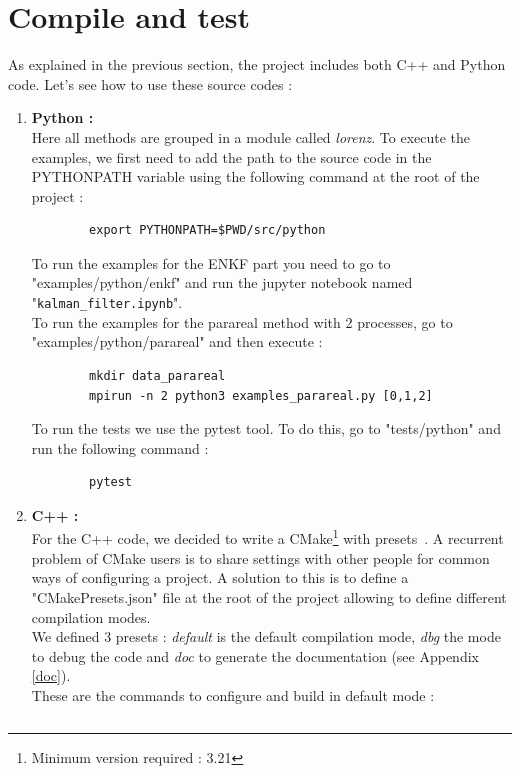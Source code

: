 \newpage

\section{Compile and test}
\label{compile}

	As explained in the previous section, the project includes both C++ and Python code. Let's see how to use these source codes :
	\begin{enumerate}[label=\textbullet]
		\item \textbf{Python :} \\
		Here all methods are grouped in a module called \textit{lorenz}. To execute the examples, we first need to add the path to the source code in the PYTHONPATH variable using the following command at the root of the project :
\begin{lstlisting}
		export PYTHONPATH=$PWD/src/python
\end{lstlisting}
		  To run the examples for the ENKF part you need to go to "examples/python/enkf" and run the jupyter notebook named "\texttt{kalman\_filter.ipynb}". \\
		To run the examples for the parareal method with 2 processes, go to "examples/python/parareal" and then execute :
\begin{lstlisting}
		mkdir data_parareal
		mpirun -n 2 python3 examples_parareal.py [0,1,2]
\end{lstlisting}
		To run the tests we use the pytest tool. To do this, go to "tests/python" and run the following command :
\begin{lstlisting}
		pytest
\end{lstlisting}
		\item \textbf{C++ :} \\
		For the C++ code, we decided to write a CMake\footnote[1]{Minimum version required : 3.21} with presets~\cite{cmake_preset}.  A recurrent problem of CMake users is to share settings with other people for common ways of configuring a project. A solution to this is to define a "CMakePresets.json" file at the root of the project allowing to define different compilation modes. \\
		We defined 3 presets : \textit{default} is the default compilation mode, \textit{dbg} the mode to debug the code and \textit{doc} to generate the documentation (see Appendix \ref{doc}). \\
		These are the commands to configure and build in default mode :
\begin{lstlisting}

\end{lstlisting}
\end{enumerate}
